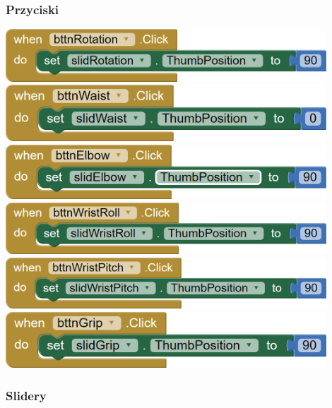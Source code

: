 \documentclass[11pt,titlepage,a4paper]{article}
\begin{document}
\newpage

\subsubsection{Przyciski}

\begin{center}
    \includegraphics[width=0.9\textwidth]{img/app_src/posButtons/bttnRotation.png}
    \includegraphics[width=0.9\textwidth]{img/app_src/posButtons/bttnWaist.png}
    \includegraphics[width=0.9\textwidth]{img/app_src/posButtons/bttnElbow.png}
    \includegraphics[width=0.9\textwidth]{img/app_src/posButtons/bttnWristRoll.png}
    \includegraphics[width=0.9\textwidth]{img/app_src/posButtons/bttnWristPitch.png}
    \includegraphics[width=0.9\textwidth]{img/app_src/posButtons/bttnGrip.png}
\end{center}

\newpage

\subsubsection{Slidery}
\end{document}
